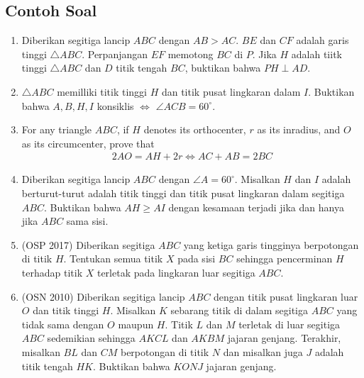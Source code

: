 \documentclass[11pt]{scrartcl}
\begin{document}
\subsection{Contoh Soal}
\begin{enumerate}
\item Diberikan segitiga lancip $ABC$ dengan $AB>AC$. $BE$ dan $CF$ adalah garis tinggi $\triangle ABC$. Perpanjangan $EF$ memotong $BC$ di $P$. Jika $H$ adalah tiitk tinggi $\triangle ABC$ dan $D$ titik tengah $BC$, buktikan bahwa $PH \perp AD$.

\item $\triangle ABC$ memilliki titik tinggi $H$ dan titik pusat lingkaran dalam $I$. Buktikan bahwa $A,B,H,I$ konsiklis $\iff$ $\angle ACB = 60^\circ$.

 \item For any triangle $ABC$, if $H$ denotes its orthocenter, $r$ as its inradius, and $O$ as its circumcenter, prove that 
 \begin{align*}
     2AO = AH + 2r \iff AC+AB=2BC
 \end{align*}

 \item Diberikan segitiga lancip $ABC$ dengan $\angle A = 60^\circ$. Misalkan $H$ dan $I$ adalah berturut-turut adalah titik tinggi dan titik pusat lingkaran dalam segitiga $ABC$. Buktikan bahwa $AH \ge AI$ dengan kesamaan terjadi jika dan hanya jika $ABC$ sama sisi.

 \item (OSP 2017) Diberikan segitiga $ABC$ yang ketiga garis tingginya berpotongan di titik $H$. Tentukan semua titik $X$ pada sisi $BC$ sehingga pencerminan $H$ terhadap titik $X$ terletak pada lingkaran luar segitiga $ABC$.

 \item (OSN 2010) Diberikan segitiga lancip $ABC$ dengan titik pusat lingkaran luar $O$ dan titik tinggi $H$. Misalkan $K$ sebarang titik di dalam segitiga $ABC$ yang tidak sama dengan $O$ maupun $H$. Titik $L$ dan $M$ terletak di luar segitiga $ABC$ sedemikian sehingga $AKCL$ dan $AKBM$ jajaran genjang. Terakhir, misalkan $BL$ dan $CM$ berpotongan di titik $N$ dan misalkan juga $J$ adalah titik tengah $HK$. Buktikan bahwa $KONJ$ jajaran genjang.
 \end{enumerate}

 \newpage
\end{document}

